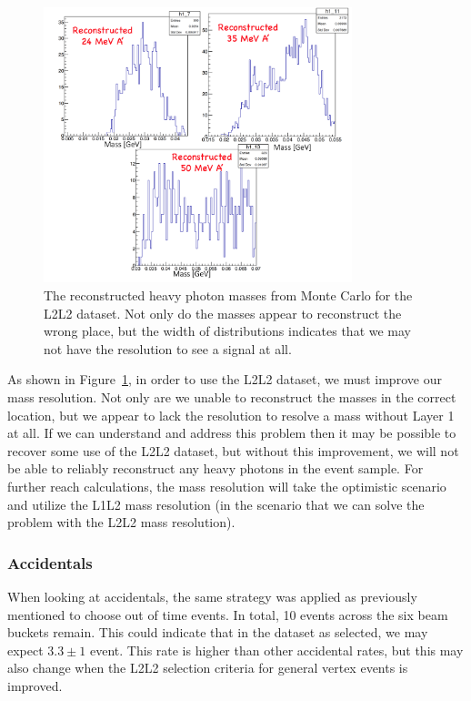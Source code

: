 \begin{figure}[H]
  \centering
     \includegraphics[width=0.8\textwidth]{plots/L2L2MassFit.png}
  \caption{The reconstructed heavy photon masses from Monte Carlo for the L2L2 dataset. Not only do the masses appear to reconstruct the wrong place, but the width of distributions indicates that we may not have the resolution to see a signal at all.}
  \label{fig:l2l2_mfit}
\end{figure} 

As shown in Figure~\ref{fig:l2l2_mfit}, in order to use the L2L2 dataset, we must improve our mass resolution. Not only are we unable to reconstruct the masses in the correct location, but we appear to lack the resolution to resolve a mass without Layer 1 at all. If we can understand and address this problem then it may be possible to recover some use of the L2L2 dataset, but without this improvement, we will not be able to reliably reconstruct any heavy photons in the event sample. For further reach calculations, the mass resolution will take the optimistic scenario and utilize the L1L2 mass resolution (in the scenario that we can solve the problem with the L2L2 mass resolution). 

\subsubsection{Accidentals}

When looking at accidentals, the same strategy was applied as previously mentioned to choose out of time events. In total, 10 events across the six beam buckets remain. This could indicate that in the dataset as selected, we may expect $3.3\pm1$ event. This rate is higher than other accidental rates, but this may also change when the L2L2 selection criteria for general vertex events is improved.

